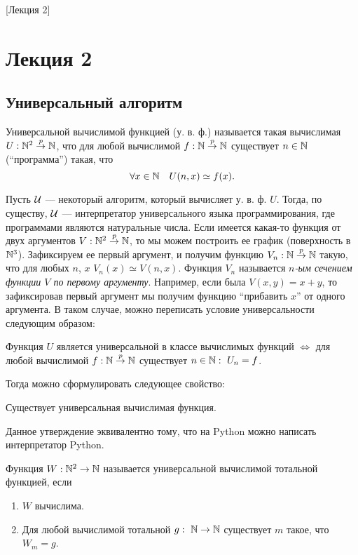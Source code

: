 [Лекция 2]
\newpage

\section{Лекция 2}

\subsection{Универсальный алгоритм}

\begin{definition}
    Универсальной вычислимой функцией (у. в. ф.) называется такая вычислимая $U: \mathbb{N}^{2} \overset{p}{\to} \mathbb{N}$, что для любой вычислимой $f: \mathbb{N} \overset{p}{\to} \mathbb{N}$ существует $n \in \mathbb{N}$ (\enquote{программа}) такая, что
    $$
        \forall x \in \mathbb{N} \quad U(n, x) \simeq f(x).
    $$
\end{definition}
Пусть $\mathcal{U}$ --- некоторый алгоритм, который вычисляет у. в. ф. $U$.
Тогда, по существу, $\mathcal{U}$ --- интерпретатор универсального языка программирования, где программами являются натуральные числа.
Если имеется какая-то функция от двух аргументов $V: \mathbb{N}^{2} \overset{p}{\to} \mathbb{N}$, то мы можем построить ее график (поверхность в $\mathbb{N}^{3}$).
Зафиксируем ее первый аргумент, и получим функцию $V_{n}: \mathbb{N} \overset{p}{\to} \mathbb{N}$ такую, что для любых $n$, $x$ $V_{n}\left(x\right) \simeq V\left(n, x\right)$.
Функция $V_{n}$ называется {\it $n$-ым сечением функции $V$ по первому аргументу}.
Например, если была $V(x, y) = x + y$, то зафиксировав первый аргумент мы получим функцию \enquote{прибавить $x$} от одного аргумента.
В таком случае, можно переписать условие универсальности следующим образом:
\begin{statement}
    Функция $U$ является универсальной в классе вычислимых функций $\iff$ для любой вычислимой $f: \mathbb{N} \overset{p}{\to} \mathbb{N}$ существует $n \in \mathbb{N}:~U_{n} = f$.
\end{statement}
Тогда можно сформулировать следующее свойство:
\begin{property}[алгоритмов]
    Существует универсальная вычислимая функция.
\end{property}
Данное утверждение эквивалентно тому, что на Python можно написать интерпретатор Python.
\begin{definition}
    Функция $W: \mathbb{N}^{2} \to \mathbb{N}$ называется универсальной вычислимой тотальной функцией, если
    \begin{enumerate}
        \item $W$ вычислима.
        \item Для любой вычислимой тотальной $g:~\mathbb{N} \to \mathbb{N}$ существует $m$ такое, что $W_{m} = g$.
    \end{enumerate}
\end{definition}
